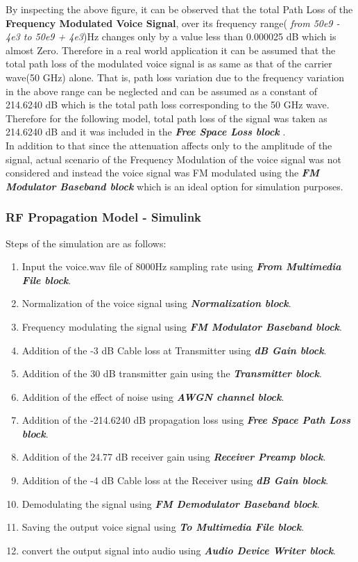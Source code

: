 \documentclass[a4paper,11pt]{article}%
\begin{document}
By inspecting the above figure, it can be observed that the total Path Loss of the \textbf{Frequency Modulated Voice Signal}, over its frequency range( \textit{from 50e9 - 4e3 to 50e9 + 4e3})Hz changes only by a value less than 0.000025 dB which is almost Zero. Therefore in a real world application it can be assumed that the total path loss of the modulated voice signal is as same as that of the carrier wave(50 GHz) alone. That is, path loss variation due to the frequency variation in the above range can be neglected and can be assumed as a constant of 214.6240 dB which is the total path loss corresponding to the 50 GHz wave. Therefore for the following model, total path loss of the signal was taken as 214.6240 dB and it was included in the \textbf{\textit{Free Space Loss block}} .\\

In addition to that since the attenuation affects only to the amplitude of the signal, actual scenario of the Frequency Modulation of the voice signal was not considered and instead the voice signal was FM modulated using the \textbf{\textit{FM Modulator Baseband block}} which is an ideal option for simulation purposes. 
\vspace{2cm}
\subsubsection{RF Propagation Model - Simulink}

Steps of the simulation are as follows:
\begin{enumerate}[1.]
	\item Input the voice.wav file of 8000Hz sampling rate using \textbf{\textit{From Multimedia File block}}.
	\item Normalization of the voice signal using \textbf{\textit{Normalization block}}.
	\item Frequency modulating the signal using \textbf{\textit{FM Modulator Baseband block}}.
	\item Addition of the -3 dB Cable loss at Transmitter using \textbf{\textit{dB Gain block}}.
	\item Addition of the 30 dB transmitter gain using the \textbf{\textit{Transmitter block}}.
	\item Addition of the effect of noise using \textbf{\textit{AWGN channel block}}.
	\item Addition of the -214.6240 dB propagation loss using \textbf{\textit{Free Space Path Loss block}}.
	\item Addition of the 24.77 dB receiver gain using  \textbf{\textit{Receiver Preamp block}}.
	\item Addition of the -4 dB Cable loss at the Receiver using \textbf{\textit{dB Gain block}}.
	\item Demodulating the signal using \textbf{\textit{FM Demodulator Baseband block}}.
	\item Saving the output voice signal using \textbf{\textit{To Multimedia File block}}.
	\item convert the output signal into audio using \textbf{\textit{Audio Device Writer block}}.
\end{enumerate}
\vspace{1cm}
\end{document}

